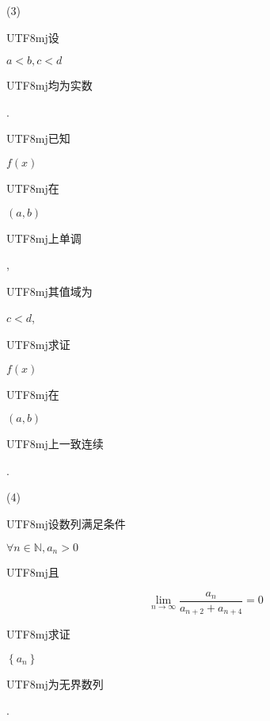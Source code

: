 \documentclass[10pt]{article}
\begin{document}
(3) \begin{CJK}{UTF8}{mj}设\end{CJK} $a<b, c<d$ \begin{CJK}{UTF8}{mj}均为实数\end{CJK}. \begin{CJK}{UTF8}{mj}已知\end{CJK} $f(x)$ \begin{CJK}{UTF8}{mj}在\end{CJK} $(a, b)$ \begin{CJK}{UTF8}{mj}上单调\end{CJK}, \begin{CJK}{UTF8}{mj}其值域为\end{CJK} $c<d$, \begin{CJK}{UTF8}{mj}求证\end{CJK} $f(x)$ \begin{CJK}{UTF8}{mj}在\end{CJK} $(a, b)$ \begin{CJK}{UTF8}{mj}上一致连续\end{CJK}.

(4) \begin{CJK}{UTF8}{mj}设数列满足条件\end{CJK} $\forall n \in \mathbb{N}, a_{n}>0$ \begin{CJK}{UTF8}{mj}且\end{CJK}
$$
\lim _{n \rightarrow \infty} \frac{a_{n}}{a_{n+2}+a_{n+4}}=0
$$
\begin{CJK}{UTF8}{mj}求证\end{CJK} $\left\{a_{n}\right\}$ \begin{CJK}{UTF8}{mj}为无界数列\end{CJK}.
\end{document}
